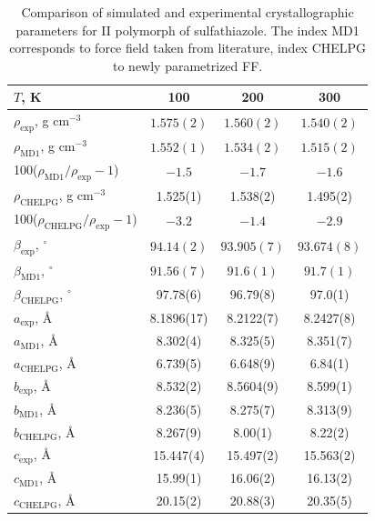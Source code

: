    \begin{table}[H]   
    \caption{Comparison of simulated and experimental \cite{drebushchak_crystal_2008} crystallographic parameters for II polymorph of sulfathiazole. The index MD1 corresponds to force field taken from literature, index CHELPG to newly parametrized FF.}    
	\centering
	\vspace{-0.1cm}
	\begin{tabular}{lccc}
		\toprule
		$T$, K & 100 & 200 & 300\\
		\midrule
		$\rho_\mathrm{exp}$, g cm$^{-3}$  & $1.575(2)$ & $1.560(2)$ & $1.540(2)$\\
		$\rho_\mathrm{MD1}$, g cm$^{-3}$ & $1.552(1)$ & $1.534(2)$ & $1.515(2)$\\
		100($\rho_\mathrm{MD1}/\rho_\mathrm{exp}-1$) & $-1.5$ & $-1.7$ & $-1.6$\\
		$\rho_\mathrm{CHELPG}$, g cm$^{-3}$ & 1.525(1) & 1.538(2) & 1.495(2)  \\
		100($\rho_\mathrm{CHELPG}/\rho_\mathrm{exp}-1$) & $-3.2$ & $-1.4$ & $-2.9$\\
		\midrule
		$\beta_\mathrm{exp}$, $^{\circ}$ & $94.14(2)$ & $93.905(7)$ & $93.674(8)$\\
		$\beta_\mathrm{MD1}$, $^{\circ}$ & $91.56(7)$ & $91.6(1)$ & $91.7(1)$\\
		$\beta_\mathrm{CHELPG}$, $^{\circ}$ & 97.78(6) & 96.79(8) & 97.0(1)\\
		\midrule
		$a_\mathrm{exp}$, \AA & 8.1896(17) & 8.2122(7) & 8.2427(8)\\
		$a_\mathrm{MD1}$, \AA & 8.302(4) & 8.325(5) & 8.351(7) \\
		$a_\mathrm{CHELPG}$, \AA & 6.739(5) & 6.648(9) & 6.84(1) \\
		\midrule
		$b_\mathrm{exp}$, \AA & 8.532(2) & 8.5604(9) & 8.599(1) \\
		$b_\mathrm{MD1}$, \AA & 8.236(5) & 8.275(7) & 8.313(9) \\
		$b_\mathrm{CHELPG}$, \AA & 8.267(9) & 8.00(1) &	8.22(2) \\
		\midrule
		$c_\mathrm{exp}$, \AA  & 15.447(4) & 15.497(2) & 15.563(2) \\
		$c_\mathrm{MD1}$, \AA & 15.99(1) & 16.06(2) & 16.13(2) \\
		$c_\mathrm{CHELPG}$, \AA & 20.15(2) & 20.88(3) & 20.35(5)\\
		\bottomrule
	\end{tabular}
	\label{tab:sulfathiazol}
	\vspace{-0.8cm}
\end{table}


